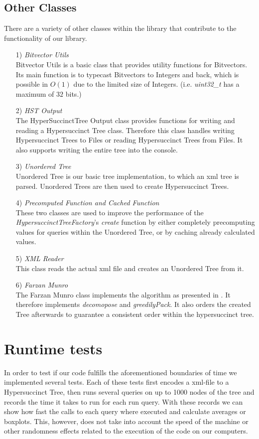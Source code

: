 \documentclass{article}
\begin{document}
\subsection{Other Classes}
There are a variety of other classes within the library that contribute to the functionality of our library.
\begin{itemize}
	\item[1)] \textit{Bitvector Utils}\\
			Bitvector Utils is a basic class that provides utility functions for Bitvectors. Its main function is to typecast Bitvectors to Integers and back, which is possible in $O(1)$ due to the limited size of Integers. (i.e. \textit{uint32\_t} has a maximum of $32$ bits.)
	\item[2)] \textit{HST Output}\\
			The HyperSuccinctTree Output class provides functions for writing and reading a Hypersuccinct Tree class. Therefore this class handles writing Hypersuccinct Trees to Files or reading Hypersuccinct Trees from Files. It also supports writing the entire tree into the console.
	\item[3)] \textit{Unordered Tree}\\
			Unordered Tree is our basic tree implementation, to which an xml tree is parsed. Unordered Trees are then used to create Hypersuccinct Trees.
	\item[4)] \textit{Precomputed Function and Cached Function}\\
			These two classes are used to improve the performance of the \textit{HypersuccinctTreeFactory}'s \textit{create} function by either completely precomputing values for queries within the Unordered Tree, or by caching already calculated values.
	\item[5)] \textit{XML Reader}\\
			This class reads the actual xml file and creates an Unordered Tree from it.
	\item[6)] \textit{Farzan Munro}\\
			The Farzan Munro class implements the algorithm as presented in \cite{farzanMunro}. It therefore implements \textit{decomopose} and \textit{greedilyPack}. It also orders the created Tree afterwards to guarantee a consistent order within the hypersuccinct tree.
\end{itemize}

\section{Runtime tests}
In order to test if our code fulfills the aforementioned boundaries of time we implemented several tests. Each of these tests first encodes a xml-file to a Hypersuccinct Tree, then runs several queries on up to 1000 nodes of the tree and records the time it takes to run for each run query. With these records we can show how fast the calls to each query where executed and calculate averages or boxplots. This, however, does not take into account the speed of the machine or other randomness effects related to the execution of the code on our computers.\\
\end{document}
